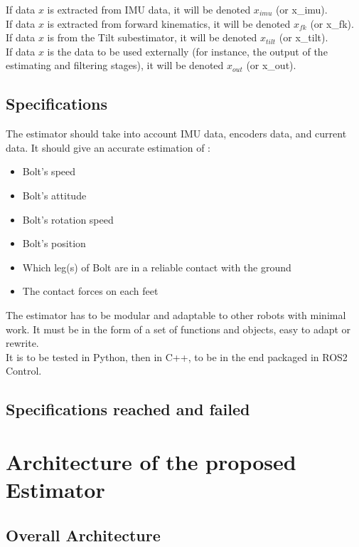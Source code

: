 \documentclass[a4paper,10pt]{article}
\begin{document}
If data $x$ is extracted from IMU data, it will be denoted $x_{imu}$ (or x\_imu).\\
If data $x$ is extracted from forward kinematics, it will be denoted $x_{fk}$ (or x\_fk).\\
If data $x$ is from the Tilt subestimator, it will be denoted $x_{tilt}$ (or x\_tilt).\\
If data $x$ is the data to be used externally (for instance, the output of the estimating and filtering stages), it will be denoted $x_{out}$ (or x\_out).\\

\subsection{Specifications}
The estimator should take into account IMU data, encoders data, and current data. It should give an accurate estimation of :
\begin{itemize}
	\item{Bolt's speed}
	\item{Bolt's attitude}
	\item{Bolt's rotation speed}
	\item{Bolt's position}
	\item{Which leg(s) of Bolt are in a reliable contact with the ground}
	\item{The contact forces on each feet}
\end{itemize}
The estimator has to be modular and adaptable to other robots with minimal work. It must be in the form of a set of functions and objects, easy to adapt or rewrite.\\  
It is to be tested in Python, then in C++, to be in the end packaged in ROS2 Control. 

\subsection{Specifications reached and failed}





\section{Architecture of the proposed Estimator}
\subsection{Overall Architecture}
\end{document}
